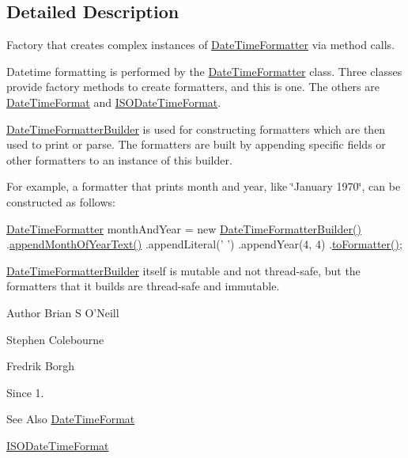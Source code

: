 \subsection{Detailed Description}
Factory that creates complex instances of \hyperlink{classorg_1_1joda_1_1time_1_1format_1_1_date_time_formatter}{Date\-Time\-Formatter} via method calls. 

Datetime formatting is performed by the \hyperlink{classorg_1_1joda_1_1time_1_1format_1_1_date_time_formatter}{Date\-Time\-Formatter} class. Three classes provide factory methods to create formatters, and this is one. The others are \hyperlink{classorg_1_1joda_1_1time_1_1format_1_1_date_time_format}{Date\-Time\-Format} and \hyperlink{classorg_1_1joda_1_1time_1_1format_1_1_i_s_o_date_time_format}{I\-S\-O\-Date\-Time\-Format}. 

\hyperlink{classorg_1_1joda_1_1time_1_1format_1_1_date_time_formatter_builder}{Date\-Time\-Formatter\-Builder} is used for constructing formatters which are then used to print or parse. The formatters are built by appending specific fields or other formatters to an instance of this builder. 

For example, a formatter that prints month and year, like \char`\"{}\-January 1970\char`\"{}, can be constructed as follows\-: 


\begin{DoxyPre}
\hyperlink{classorg_1_1joda_1_1time_1_1format_1_1_date_time_formatter}{DateTimeFormatter} monthAndYear = new \hyperlink{classorg_1_1joda_1_1time_1_1format_1_1_date_time_formatter_builder_aec2c332fc9bcee66ccf7bc357f8d0f76}{DateTimeFormatterBuilder()}
    .\hyperlink{classorg_1_1joda_1_1time_1_1format_1_1_date_time_formatter_builder_adcb621002498d0aa796a008caee803d8}{appendMonthOfYearText()}
    .appendLiteral(' ')
    .appendYear(4, 4)
    .\hyperlink{classorg_1_1joda_1_1time_1_1format_1_1_date_time_formatter_builder_afacacf2fabd98cc9bdd841d4f603e825}{toFormatter()};
\end{DoxyPre}
 

\hyperlink{classorg_1_1joda_1_1time_1_1format_1_1_date_time_formatter_builder}{Date\-Time\-Formatter\-Builder} itself is mutable and not thread-\/safe, but the formatters that it builds are thread-\/safe and immutable.

\begin{DoxyAuthor}{Author}
Brian S O'Neill 

Stephen Colebourne 

Fredrik Borgh 
\end{DoxyAuthor}
\begin{DoxySince}{Since}
1. 
\end{DoxySince}
\begin{DoxySeeAlso}{See Also}
\hyperlink{classorg_1_1joda_1_1time_1_1format_1_1_date_time_format}{Date\-Time\-Format} 

\hyperlink{classorg_1_1joda_1_1time_1_1format_1_1_i_s_o_date_time_format}{I\-S\-O\-Date\-Time\-Format} 
\end{DoxySeeAlso}


